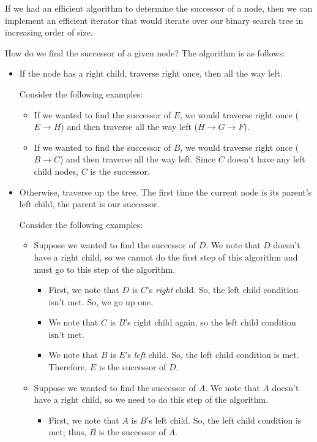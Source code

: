 \documentclass[letterpaper]{article}
\begin{document}
If we had an efficient algorithm to determine the successor of a node, then we can implement an efficient iterator that would iterate over our binary search tree in increasing order of size.

\bigskip 

How do we find the successor of a given node? The algorithm is as follows: 
\begin{itemize}
    \item If the node has a right child, traverse right once, then all the way left. 
    
    \bigskip 

    Consider the following examples: 
    \begin{itemize}
        \item If we wanted to find the successor of $E$, we would traverse right once ($E \to \boxed{H}$) and then traverse all the way left ($H \to G \to \boxed{F}$).
        \item If we wanted to find the successor of $B$, we would traverse right once ($B \to C$) and then traverse all the way left. Since $C$ doesn't have any left child nodes, $\boxed{C}$ is the successor. 
    \end{itemize}

    \item Otherwise, traverse up the tree. The first time the current node is its parent's left child, the parent is our successor. 
    
    \bigskip 

    Consider the following examples: 
    \begin{itemize}
        \item Suppose we wanted to find the successor of $D$. We note that $D$ doesn't have a right child, so we cannot do the first step of this algorithm and must go to this step of the algorithm. 
        \begin{itemize}
            \item First, we note that $D$ is $C$'s \emph{right} child. So, the left child condition isn't met. So, we go up one. 
            \item We note that $C$ is $B$'s right child again, so the left child condition isn't met. 
            \item We note that $B$ is $E$'s \emph{left} child. So, the left child condition is met. Therefore, $E$ is the successor of $D$. 
        \end{itemize}

        \item Suppose we wanted to find the successor of $A$. We note that $A$ doesn't have a right child, so we need to do this step of the algorithm.
        \begin{itemize}
            \item First, we note that $A$ is $B$'s left child. So, the left child condition is met; thus, $B$ is the successor of $A$. 
        \end{itemize}
    \end{itemize}
\end{itemize}
\end{document}
